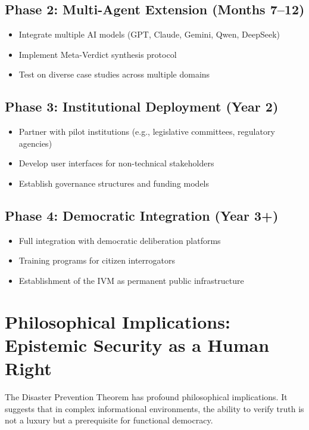 \documentclass[11pt,a4paper]{article}
\begin{document}
\subsection{Phase 2: Multi-Agent Extension (Months 7--12)}

\begin{itemize}
    \item Integrate multiple AI models (GPT, Claude, Gemini, Qwen, DeepSeek)
    \item Implement Meta-Verdict synthesis protocol
    \item Test on diverse case studies across multiple domains
\end{itemize}

\subsection{Phase 3: Institutional Deployment (Year 2)}

\begin{itemize}
    \item Partner with pilot institutions (e.g., legislative committees, regulatory agencies)
    \item Develop user interfaces for non-technical stakeholders
    \item Establish governance structures and funding models
\end{itemize}

\subsection{Phase 4: Democratic Integration (Year 3+)}

\begin{itemize}
    \item Full integration with democratic deliberation platforms \citep{Kovnatsky2025SVE5}
    \item Training programs for citizen interrogators
    \item Establishment of the IVM as permanent public infrastructure
\end{itemize}

\section{Philosophical Implications: Epistemic Security as a Human Right}

The Disaster Prevention Theorem has profound philosophical implications. It suggests that in complex informational environments, the ability to verify truth is not a luxury but a prerequisite for functional democracy.
\end{document}
